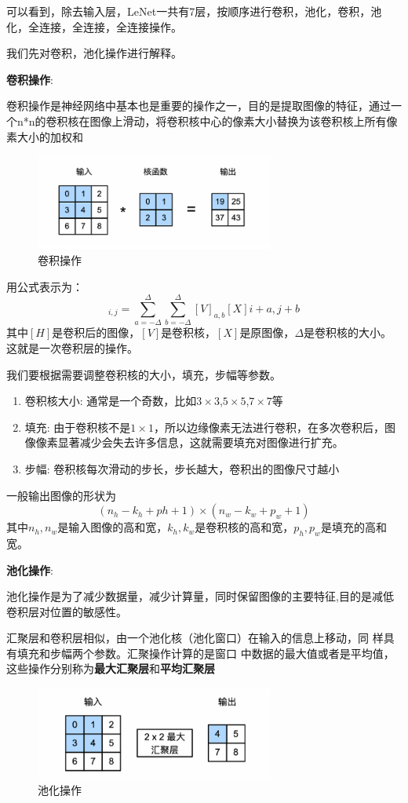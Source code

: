 可以看到，除去输入层，LeNet一共有7层，按顺序进行卷积，池化，卷积，池化，全连接，全连接，全连接操作。

我们先对卷积，池化操作进行解释。

\textbf{卷积操作}:

卷积操作是神经网络中基本也是重要的操作之一，目的是提取图像的特征，通过一个n*n的卷积核在图像上滑动，将卷积核中心的像素大小替换为该卷积核上所有像素大小的加权和
\begin{figure}[H]
    \centering
    \includegraphics[width=0.7\textwidth]{images/卷积.png}
    \caption{卷积操作}
    \label{fig:卷积}
\end{figure}
用公式表示为：
\begin{equation}
    [H]_{i,j}=\sum_{a=-\Delta }^{\Delta}\sum_{b=-\Delta}^{\Delta}[V]_{a,b}[X]{i+a,j+b}   
\end{equation}
其中$[H]$是卷积后的图像，$[V]$是卷积核，$[X]$是原图像，$\Delta$是卷积核的大小。
这就是一次卷积层的操作。

我们要根据需要调整卷积核的大小，填充，步幅等参数。
\begin{enumerate}
    \item 卷积核大小: 通常是一个奇数，比如$3\times3$,$5\times5$,$7\times7$等
    \item 填充: 由于卷积核不是$1\times1$，所以边缘像素无法进行卷积，在多次卷积后，图像像素显著减少会失去许多信息，这就需要填充对图像进行扩充。
    \item 步幅: 卷积核每次滑动的步长，步长越大，卷积出的图像尺寸越小
\end{enumerate}
一般输出图像的形状为
\begin{equation}
    (n_{h}-k_{h}+p{h}+1) \times (n_{w}-k_{w}+p_{w}+1)
\end{equation}
其中$n_{h},n_{w}$是输入图像的高和宽，$k_{h},k_{w}$是卷积核的高和宽，$p_{h},p_{w}$是填充的高和宽。

\textbf{池化操作}:

池化操作是为了减少数据量，减少计算量，同时保留图像的主要特征,目的是减低卷积层对位置的敏感性。

汇聚层和卷积层相似，由一个池化核（池化窗口）在输入的信息上移动，同
样具有填充和步幅两个参数。汇聚操作计算的是窗口
中数据的最大值或者是平均值，这些操作分别称为\textbf{最大汇聚层}和\textbf{平均汇聚层}
\begin{figure}[H]
    \centering
    \includegraphics[width=0.7\textwidth]{images/池化.png}
    \caption{池化操作}
    \label{fig:池化}
\end{figure}


